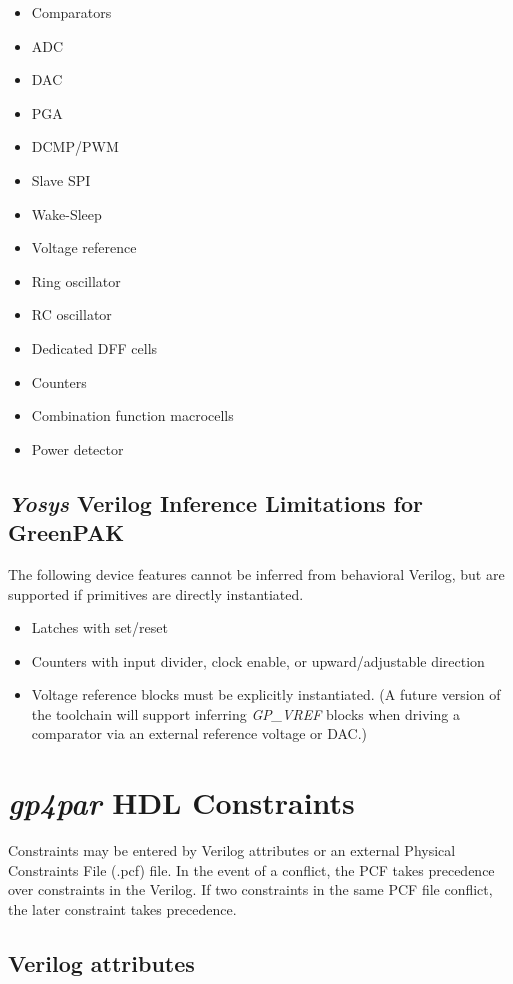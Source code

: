 \documentclass[11pt]{article}
\newcommand{\namestyle}[1]{\textit{#1}}
\begin{document}
\begin{itemize}
\item Comparators
\item ADC
\item DAC
\item PGA
\item DCMP/PWM
\item Slave SPI
\item Wake-Sleep
\item Voltage reference
\item Ring oscillator
\item RC oscillator
\item Dedicated DFF cells
\item Counters
\item Combination function macrocells
\item Power detector
\end{itemize}

\subsection{\namestyle{Yosys} Verilog Inference Limitations for GreenPAK}

The following device features cannot be inferred from behavioral Verilog, but are supported if primitives are directly
instantiated.

\begin{itemize}
\item Latches with set/reset
\item Counters with input divider, clock enable, or upward/adjustable direction
\item Voltage reference blocks must be explicitly instantiated. (A future version of the toolchain will support inferring
\namestyle{GP\_VREF} blocks when driving a comparator via an external reference voltage or DAC.)
\end{itemize}

\pagebreak
\section{\namestyle{gp4par} HDL Constraints}

Constraints may be entered by Verilog attributes or an external Physical Constraints File (.pcf) file. In the event of
a conflict, the PCF takes precedence over constraints in the Verilog. If two constraints in the same PCF file conflict,
the later constraint takes precedence.

\subsection{Verilog attributes}
\end{document}
